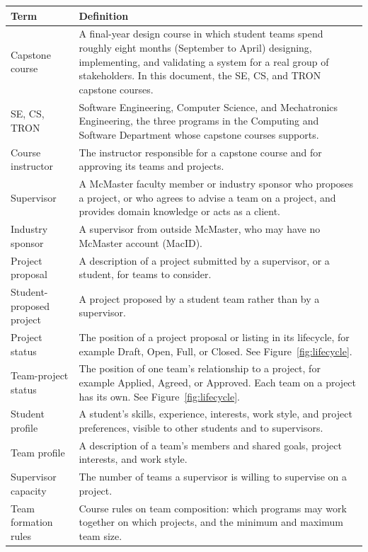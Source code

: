 \documentclass[12pt]{article}
\newcounter{tin}
\begin{document}
  \begin{longtable}{p{} p{}}
    \toprule
    Term & Definition\\
    \midrule
    Capstone course & A final-year design course in which student teams spend roughly eight months
    (September to April) designing, implementing, and validating a system for a real group of
    stakeholders. In this document, the SE, CS, and TRON capstone courses.\\
    SE, CS, TRON & Software Engineering, Computer Science, and Mechatronics Engineering, the three
    programs in the Computing and Software Department whose capstone courses \projname{} supports.\\
    Course instructor & The instructor responsible for a capstone course and for approving its
    teams and projects.\\
    Supervisor & A McMaster faculty member or industry sponsor who proposes a project, or who agrees to
    advise a team on a project, and provides domain knowledge or acts as a client.\\
    Industry sponsor & A supervisor from outside McMaster, who may have no McMaster account (MacID).\\
    Project proposal & A description of a project submitted by a supervisor, or a student, for
    teams to consider.\\
    Student-proposed project & A project proposed by a student team rather than by a supervisor.\\
    Project status & The position of a project proposal or listing in its lifecycle, for example Draft,
    Open, Full, or Closed. See Figure~\ref{fig:lifecycle}. \\
    Team-project status & The position of one team's relationship to a project, for example Applied,
    Agreed, or Approved. Each team on a project has its own. See Figure~\ref{fig:lifecycle}. \\
    Student profile & A student's skills, experience, interests, work style, and project preferences, visible to
    other students and to supervisors.\\
    Team profile & A description of a team's members and shared goals, project interests, and work style.\\
    Supervisor capacity & The number of teams a supervisor is willing to supervise on a project.\\
    Team formation rules & Course rules on team composition: which programs may work together on
    which projects, and the minimum and maximum team size.\\

\end{longtable}
\end{document}
